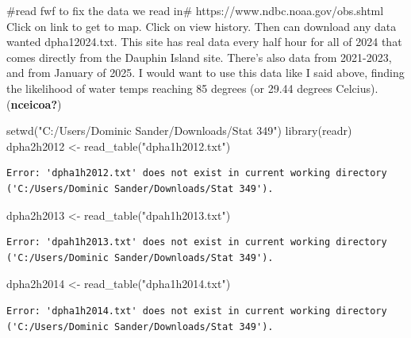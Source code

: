 \documentclass[
  letterpaper,
  DIV=11,
  numbers=noendperiod]{scrreprt}
\newenvironment{Shaded}{\begin{snugshade}}{\end{snugshade}}
\newcommand{\FunctionTok}[1]{\textcolor[rgb]{0.28,0.35,0.67}{#1}}
\newcommand{\NormalTok}[1]{\textcolor[rgb]{0.00,0.23,0.31}{#1}}
\newcommand{\OtherTok}[1]{\textcolor[rgb]{0.00,0.23,0.31}{#1}}
\newcommand{\StringTok}[1]{\textcolor[rgb]{0.13,0.47,0.30}{#1}}
\begin{document}
\#read fwf to fix the data we read in\#
https://www.ndbc.noaa.gov/obs.shtml Click on link to get to map. Click
on view history. Then can download any data wanted dpha12024.txt. This
site has real data every half hour for all of 2024 that comes directly
from the Dauphin Island site. There's also data from 2021-2023, and from
January of 2025. I would want to use this data like I said above,
finding the likelihood of water temps reaching 85 degrees (or 29.44
degrees Celcius). (\textbf{nceicoa?})

\begin{Shaded}
\begin{Highlighting}[]
\FunctionTok{setwd}\NormalTok{(}\StringTok{"C:/Users/Dominic Sander/Downloads/Stat 349"}\NormalTok{)}
\FunctionTok{library}\NormalTok{(readr)}
\NormalTok{dpha2h2012 }\OtherTok{\textless{}{-}} \FunctionTok{read\_table}\NormalTok{(}\StringTok{"dpha1h2012.txt"}\NormalTok{)}
\end{Highlighting}
\end{Shaded}

\begin{verbatim}
Error: 'dpha1h2012.txt' does not exist in current working directory ('C:/Users/Dominic Sander/Downloads/Stat 349').
\end{verbatim}

\begin{Shaded}
\begin{Highlighting}[]
\NormalTok{dpha2h2013 }\OtherTok{\textless{}{-}} \FunctionTok{read\_table}\NormalTok{(}\StringTok{"dpah1h2013.txt"}\NormalTok{)}
\end{Highlighting}
\end{Shaded}

\begin{verbatim}
Error: 'dpah1h2013.txt' does not exist in current working directory ('C:/Users/Dominic Sander/Downloads/Stat 349').
\end{verbatim}

\begin{Shaded}
\begin{Highlighting}[]
\NormalTok{dpha2h2014 }\OtherTok{\textless{}{-}} \FunctionTok{read\_table}\NormalTok{(}\StringTok{"dpha1h2014.txt"}\NormalTok{)}
\end{Highlighting}
\end{Shaded}

\begin{verbatim}
Error: 'dpha1h2014.txt' does not exist in current working directory ('C:/Users/Dominic Sander/Downloads/Stat 349').
\end{verbatim}
\end{document}
